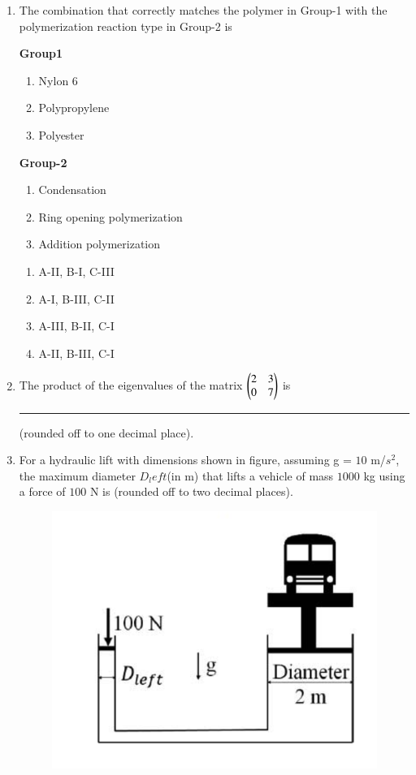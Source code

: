 \documentclass[journal,12pt,onecolumn]{IEEEtran}
\theoremstyle{remark}
\begin{document}
\begin{enumerate}
    \item The combination that correctly matches the polymer in Group-1 with the polymerization reaction type in Group-2 is
    
 \hfill{}
 
\begin{multicols}{2}
    \textbf{Group1}
    \begin{enumerate}[label=(\Alph*)]
        \item Nylon 6
        \item Polypropylene
        \item Polyester
    \end{enumerate}
\columnbreak

    \textbf{Group-2}
    \begin{enumerate}[label=(\Roman*)]
        \item Condensation
        \item Ring opening polymerization
        \item Addition polymerization
    \end{enumerate}
\end{multicols}
\begin{multicols}{2}
    \begin{enumerate}
        \item A-II, B-I, C-III
        \item A-I, B-III, C-II
        \item A-III, B-II, C-I
        \item A-II, B-III, C-I
    \end{enumerate}
\end{multicols}

    \item 
        The product of the eigenvalues of the matrix  $\begin{pmatrix}
            2 & 3 \\
            0 & 7
        \end{pmatrix}$ is \rule{2cm}{0.1mm} (rounded off to one decimal place).
        
  \hfill{}    

    \item For a hydraulic lift with dimensions shown in figure, assuming g = $10$ m/$s^2$, the maximum diameter $D_left$(in m) that lifts a vehicle of mass $1000$ kg using a force of $100$ N is (rounded off to two decimal places).
    
 \hfill{}
    \begin{figure}[H]
        \centering
        \includegraphics[width=0.4\columnwidth]{Fig/23.png}
        \caption*{}
        \label{fig: 23}
    \end{figure}


\end{enumerate}
\end{document}
